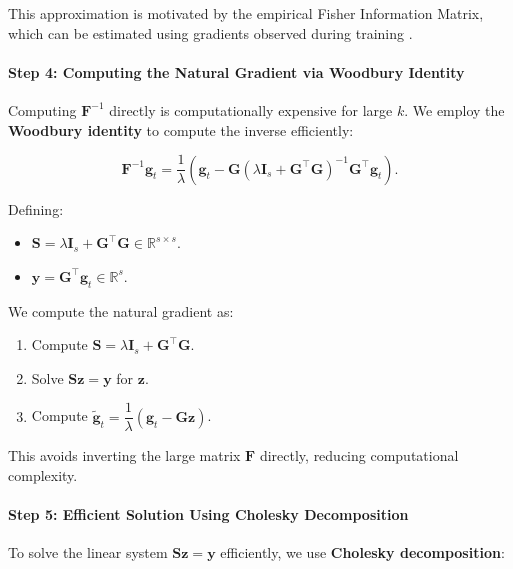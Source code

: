 This approximation is motivated by the empirical Fisher Information Matrix, which can be estimated using gradients observed during training \citep{martensNewPerspectiveNatural2014}.

\paragraph{Step 4: Computing the Natural Gradient via Woodbury Identity}

Computing $\mathbf{F}^{-1}$ directly is computationally expensive for large $k$. We employ the \textbf{Woodbury identity} to compute the inverse efficiently:

\[
\mathbf{F}^{-1} \mathbf{g}_t = \frac{1}{\lambda} \left( \mathbf{g}_t - \mathbf{G} \left( \lambda \mathbf{I}_s + \mathbf{G}^\top \mathbf{G} \right)^{-1} \mathbf{G}^\top \mathbf{g}_t \right).
\]

Defining:

\begin{itemize}
    \item $\mathbf{S} = \lambda \mathbf{I}_s + \mathbf{G}^\top \mathbf{G} \in \mathbb{R}^{s \times s}$.
    \item $\mathbf{y} = \mathbf{G}^\top \mathbf{g}_t \in \mathbb{R}^s$.
\end{itemize}

We compute the natural gradient as:

\begin{enumerate}
    \item Compute $\mathbf{S} = \lambda \mathbf{I}_s + \mathbf{G}^\top \mathbf{G}$.
    \item Solve $\mathbf{S} \mathbf{z} = \mathbf{y}$ for $\mathbf{z}$.
    \item Compute $\tilde{\mathbf{g}}_t = \dfrac{1}{\lambda} \left( \mathbf{g}_t - \mathbf{G} \mathbf{z} \right)$.
\end{enumerate}

This avoids inverting the large matrix $\mathbf{F}$ directly, reducing computational complexity.

\paragraph{Step 5: Efficient Solution Using Cholesky Decomposition}

To solve the linear system $\mathbf{S} \mathbf{z} = \mathbf{y}$ efficiently, we use \textbf{Cholesky decomposition}:

